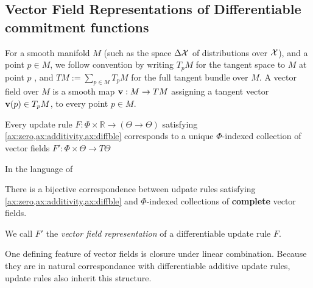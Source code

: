 \documentclass{article}
\def\cofunc{commitment function}
\begin{document}
\subsection{Vector Field Representations of Differentiable \cofunc s}
    \label{sec:vecrep}
For a smooth manifold $M$
(such as the space $\Delta \mathcal X$ of distributions over $\mathcal X$),
and a point $p \in M$, we follow convention by writing $T_p M$ for the tangent space to $M$ at point $p$ \parencite{lee2013smooth}, and %
$TM := \sum_{p \in M} T_p M$ for the full tangent bundle over $M$.
%
A vector field over $M$ is a smooth map $\mathbf{v} : M \to T M$ assigning a tangent vector $\mathbf{v}(p) \in T_p M$, to every point $p \in M$.

\begin{theorem}
    Every update rule $F : \Phi \times \mathbb R \to (\Theta  \to \Theta)$
    satisfying \cref{ax:zero,ax:additivity,ax:diffble} corresponds to a unique
    $\Phi$-indexed collection of vector fields
        $F' : \Phi \times \Theta \to T\Theta$
\end{theorem}

In the language of 

\begin{coro}\label{thm:vecrep}
    There is a bijective correspondence between udpate rules satisfying \cref{ax:zero,ax:additivity,ax:diffble} and $\Phi$-indexed collections of \textbf{complete} vector fields.
\end{coro}

We call $F'$ the \emph{vector field representation} of a differentiable update rule $F$.

One defining feature of vector fields is closure under linear
    combination.
Because they are in natural correspondance with differentiable additive update rules, update rules also inherit this structure.
\end{document}
